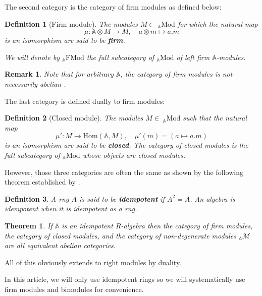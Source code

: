 \documentclass[a4paper,fleqn]{cas-sc}
\newtheorem{thm}{Theorem}%
\newtheorem{rem}{Remark}%
\newtheorem{dfnt}{Definition}%
\newcommand{\bA}{\mathbb{A}}
\newcommand{\fmod}{\mathrm{FMod}}
\begin{document}
The second category is the category of firm modules as defined below: 

\begin{dfnt}[Firm module]
The modules $M \in \;_\bA \mathrm{Mod}$ %
for which the natural map
\[
\mu : \bA \otimes M \to M, \quad a \otimes m \mapsto a.m
\]
is an isomorphism 
are said to be \textbf{firm}. 

We will denote by $_\bA\fmod$ the full subcategory of $_\bA \mathrm{Mod}$ of left firm $\bA$-modules.
\end{dfnt}

\begin{rem}
Note that for arbitrary $\bA$, the category of firm modules is not necessarily abelian \cite{gonzalez}.
\end{rem}


The last category is defined dually to firm modules:  

\begin{dfnt}[Closed module]
The modules $M \in \;_\bA \mathrm{Mod}$ such that the natural map
\[
\mu' : M \to \mathrm{Hom}(\bA,M), \quad
\mu'(m) = (a \mapsto a.m)
\]
is an isomorphism 
are said to be \textbf{closed}. The category of closed modules is the full subcategory of $_\bA \mathrm{Mod}$ whose objects are closed modules. 
\end{dfnt}

However, those three categories are often the same as shown by the following theorem established by \cite{quillen}. 

\begin{dfnt}
A rng $A$ is said to be \textbf{idempotent} if $A^2 = A$.
An algebra is idempotent when it is idempotent as a rng.
\end{dfnt}

\begin{thm}
If $\bA$ is an idempotent $R$-algebra 
then the category of firm modules, the category of closed modules, and the category of non-degenerate modules $_\bA \mathcal{M}$ are all equivalent abelian categories.
\end{thm}
All of this obviously extends to right modules by duality.

In this article, we will only use idempotent rings so we will systematically use firm modules and bimodules for convenience. %
\end{document}
